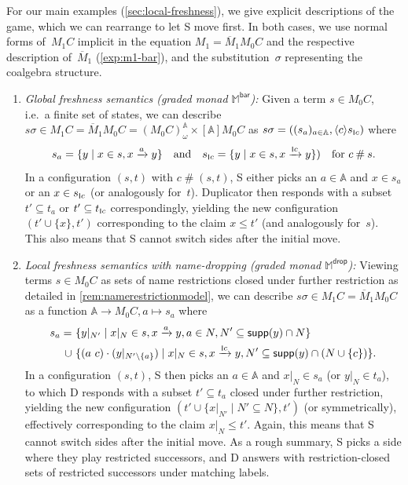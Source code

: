 \documentclass[a4paper,UKenglish,cleveref,thm-restate,numberwithinsect,final]{lipics-v2021}
\newcommand{\Br}{\mathsf{bar}}
\newcommand{\drop}{\mathsf{drop}}
\newcommand{\Names}{\mathbb{A}}
\newcommand{\fresh}{\mathbin{\#}}
\newcommand{\supp}{\mathsf{supp}}
\newcommand{\bind}[1]{\langle #1\rangle}
\newcommand{\mbar}{\overline{M}_1}
\theoremstyle{plain}
\newcommand{\scriptmidmid}{\hspace{0.2ex}{\rule[-0.1ex]{0.6pt}{1.1ex}}\hspace{0.2ex}}
\newcommand{\scriptnew}[1]{{\scriptmidmid}#1}
\numberwithin{equation}{section}
\newcommand{\monad}{{\mathbb{M}}}
\newcommand{\+}[1]{\mathcal{#1}\xspace}
\newcommand{\names}{\mathbb{A}}
\theoremstyle{definition}
\begin{document}
\begin{example}
  \label{exp:explicit-games}
  For our main examples (\cref{sec:local-freshness}), we give explicit
  descriptions of the game, which we can rearrange to let S move
  first.  In both cases, we use normal
  forms of~$M_1C$ implicit in the equation $M_1=\mbar M_0C$ and the
  respective description of~$\mbar$ (\autoref{exp:m1-bar}), and the
  substitution~$\sigma$ representing the coalgebra structure.
  \begin{enumerate}[wide]
  \item \emph{Global freshness semantics (graded monad\/
      $\monad^\Br$):} Given a term $s \in M_0C$, i.e.~a finite
    set of states, we can describe
    $s\sigma \in M_1 C = \mbar M_0 C=(M_0 C)^{\Names}_\omega \times
    [\Names]M_0 C$ as
    $s\sigma =((s_a)_{a\in\names}, \bind{c}s_{\scriptnew{c}})$ where
      \begin{equation*}
        s_a = \{y \mid x \in s, x \xrightarrow{a} y\} \quad\text{and}\quad s_{\scriptnew{c}} = \{y \mid x \in s, x \xrightarrow{\scriptnew{c}} y\}) \quad\text{for } c\fresh s.
      \end{equation*}
      In a configuration $(s,t)$ with $c\fresh(s,t)$, S either picks an $a \in \Names$ and $x \in s_a$ or an $x \in s_{\scriptnew{c}}$ (or analogously for~$t$).
      Duplicator then responds with a subset $t' \subseteq t_a$ or $t' \subseteq t_{\scriptnew{c}}$ correspondingly, yielding the new configuration $(t' \cup \{x\}, t')$ corresponding to the claim $x\le t'$ (and analogously for~$s$).
      This also means that S cannot switch sides after the initial move.

    \item \emph{Local freshness semantics with name-dropping (graded
        monad\/ $\monad^\drop$):} Viewing terms $s\in M_0C$ as sets of
      name restrictions closed under further restriction as detailed
      in \cref{rem:namerestrictionmodel}, we can describe
      $s\sigma \in M_1C = \mbar M_0 C$ as a function
      $\Names \to M_0 C, a \mapsto s_a$ where
      \begin{align*}
        s_a
          =~&\{ y|_{N'} \mid x|_N \in s, x \xrightarrow{a} y, a \in N, N' \subseteq \supp(y) \cap N \} \\
          \cup~&\{ (a\ c) \cdot (y|_{N' \setminus \{a\}}) \mid x|_N \in s, x \xrightarrow{\scriptnew{c}} y, N' \subseteq \supp(y) \cap (N \cup \{c\}) \}.
      \end{align*}
      In a configuration $(s, t)$, S then picks an $a \in \Names$ and
      $x|_N \in s_a$ (or $y|_N\in t_a$), to which D responds
      with a subset $t' \subseteq t_a$ closed under further
      restriction, yielding the new configuration
      $(t' \cup \{x|_{N'} \mid N' \subseteq N\}, t')$ (or
      symmetrically), effectively corresponding to the claim
      $x|_N\le t'$. Again, this means that S cannot switch sides
      after the initial move. As a rough summary, S picks a side
      where they play restricted successors, and D answers
      with restriction-closed sets of restricted successors under
      matching labels.
  \end{enumerate}
\end{example}
\end{document}
